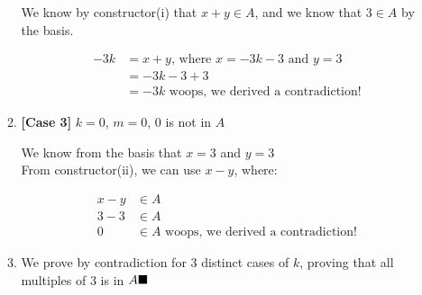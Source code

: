 \documentclass{article}
\begin{document}
\begin{itemize}
\begin{enumerate}[label=\arabic*.]
\begin{center}
                    We know by constructor(i) that $x+y \in A$, and we know that $3 \in A$ by the basis.
                \end{center}
                \begin{align*}
                    -3k &= x+y \text{, where } x = -3k -3 \text{ and } y = 3\\
                        &= -3k -3 + 3\\
                        &= -3k \text{ woops, we derived a contradiction!}
                \end{align*}
                \item \textbf{[Case 3]} $k = 0$, $m = 0$, $0$ is not in $A$
                \begin{center}
                    We know from the basis that $x = 3$ and $y = 3$\\
                    From constructor(ii), we can use $x - y$, where:
                \end{center}
                \begin{align*}
                    x - y &\in A\\
                    3 - 3 &\in A\\
                    0 &\in A \text{ woops, we derived a contradiction!}
                \end{align*}
                \item We prove by contradiction for 3 distinct cases of $k$, proving that all multiples of 3 is in $A \hfill\blacksquare$
            \end{enumerate}
    \end{itemize}
    
\end{document}
